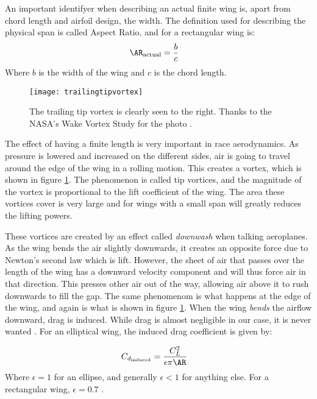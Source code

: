     An important identifyer when describing an actual finite wing is, apart from chord length and airfoil design, the width. The definition used for describing the physical span is called Aspect Ratio, and for a rectangular wing is:
    \begin{align}
        \AR_\text{actual} &= \frac{b}{c}
        \label{eq:ARactual}
    \end{align}
    Where $b$ is the width of the wing and $c$ is the chord length.

    \begin{figure}
      \texttt{[image: trailingtipvortex]}
      \caption{The trailing tip vortex is clearly seen to the right. Thanks to the NASA's Wake Vortex Study for the photo \cite{nasatipvortex}.}
      \label{fig:trailingtipvortices}
    \end{figure}

    The effect of having a finite length is very important in race aerodynamics. As pressure is lowered and increased on the different sides, air is going to travel around the edge of the wing in a rolling motion. This creates a vortex, which is shown in figure \ref{fig:trailingtipvortices}. The phenomenon is called tip vortices, and the magnitude of the vortex is proportional to the lift coefficient of the wing. The area these vortices cover is very large and for wings with a small span will greatly reduces the lifting powers.

    These vortices are created by an effect called \emph{downwash} when talking aeroplanes. As the wing bends the air slightly downwards, it creates an opposite force due to Newton's second law which is lift. However, the sheet of air that passes over the length of the wing has a downward velocity component and will thus force air in that direction. This presses other air out of the way, allowing air above it to rush downwards to fill the gap. The same phenomenom is what happens at the edge of the wing, and again is what is shown in figure \ref{fig:trailingtipvortices}. When the wing \emph{bends} the airflow downward, drag is induced. While drag is almost negligible in our case, it is never wanted \cite{peterkampf}. For an elliptical wing, the induced drag coefficient is given by:

    \begin{align}
      C_{d_\text{induced}} &= \frac{C_L^2}{\epsilon \pi \AR }
    \end{align}
    Where $\epsilon = 1$ for an ellipse, and generally $\epsilon < 1$ for anything else. For a rectangular wing, $\epsilon = 0.7$ \cite{nasainduceddrag}.

